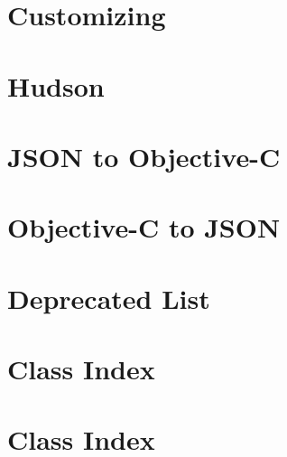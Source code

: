 \documentclass[a4paper]{book}
\begin{document}
\chapter{\-Customizing}
\label{Customizing}
\hypertarget{Customizing}{}

\chapter{\-Hudson}
\label{Hudson}
\hypertarget{Hudson}{}

\chapter{\-J\-S\-O\-N to \-Objective-\/\-C}
\label{json2objc}
\hypertarget{json2objc}{}

\chapter{\-Objective-\/\-C to \-J\-S\-O\-N}
\label{objc2json}
\hypertarget{objc2json}{}

\chapter{\-Deprecated \-List}
\label{deprecated}
\hypertarget{deprecated}{}

\chapter{\-Class \-Index}

\chapter{\-Class \-Index}

\end{document}

